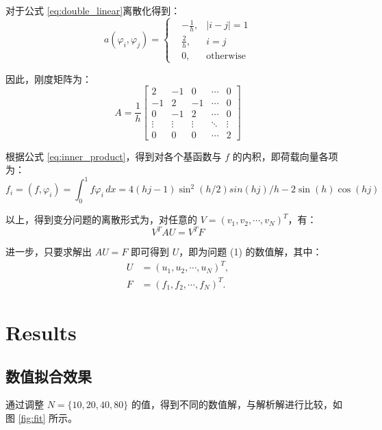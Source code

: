 \documentclass[11pt]{ctexart}
\begin{document}
	
	
	对于公式 \eqref{eq:double_linear}离散化得到：
	\begin{equation}
		a(\varphi_i, \varphi_j)=\left\{
		\begin{aligned}
			&-\frac{1}{h}, & |i-j| = 1\\
			&\frac{2}{h}, &i = j\\
			&0,  &\text{otherwise}
		\end{aligned}
		\right.
	\end{equation}
	
	因此，刚度矩阵为：
	\begin{equation}
		A = \frac{1}{h}\begin{bmatrix}
			2 & -1 & 0 & \cdots & 0 \\
			-1 & 2 & -1 & \cdots & 0 \\
			0 & -1 & 2 & \cdots & 0 \\
			\vdots & \vdots & \vdots & \ddots & \vdots \\
			0 & 0 & 0 & \cdots & 2
		\end{bmatrix}
	\end{equation}

	根据公式 \eqref{eq:inner_product}，得到对各个基函数与 $f$ 的内积，即荷载向量各项为：
	\begin{equation}
		f_i = (f, \varphi_i) = \int_0^1 f \varphi_i \, dx = 4(hj-1)\sin^2(h/2)sin(hj)/h-2\sin(h)\cos(hj)
	\end{equation}

	以上，得到变分问题的离散形式为，对任意的 $ V=(v_1,v_2,\cdots,v_{N})^T $，有： 
	\begin{equation}
		V^TAU = V^TF
	\end{equation}

	进一步，只要求解出 $ AU = F $ 即可得到 $ U $，即为问题 (1) 的数值解，其中：
	\begin{equation}
		\begin{aligned}
			U &= (u_1, u_2, \cdots, u_{N})^T, \\
			F &= (f_1, f_2, \cdots, f_{N})^T.
		\end{aligned}
	\end{equation} 

\section{Results}

\subsection{数值拟合效果}
通过调整 $N=\{10,20,40,80\}$ 的值，得到不同的数值解，与解析解进行比较，如图 \ref{fig:fit} 所示。
\end{document}
